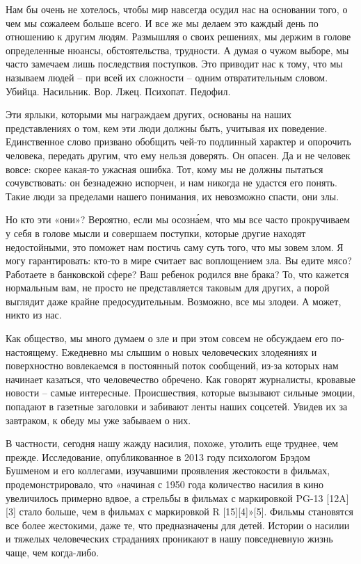 Нам бы очень не хотелось, чтобы мир навсегда осудил нас на основании того, о
чем мы сожалеем больше всего. И все же мы делаем это каждый день по отношению к
другим людям. Размышляя о своих решениях, мы держим в голове определенные
нюансы, обстоятельства, трудности. А думая о чужом выборе, мы часто замечаем
лишь последствия поступков. Это приводит нас к тому, что мы называем людей –
при всей их сложности – одним отвратительным словом. Убийца. Насильник. Вор.
Лжец. Психопат. Педофил.
	
	

Эти ярлыки, которыми мы награждаем других, основаны на наших представлениях о том, кем эти люди должны быть, учитывая их поведение. Единственное слово призвано обобщить чей-то подлинный характер и опорочить человека, передать другим, что ему нельзя доверять. Он опасен. Да и не человек вовсе: скорее какая-то ужасная ошибка. Тот, кому мы не должны пытаться сочувствовать: он безнадежно испорчен, и нам никогда не удастся его понять. Такие люди за пределами нашего понимания, их невозможно спасти, они злы.

Но кто эти «они»? Вероятно, если мы осозна́ем, что мы все часто прокручиваем у себя в голове мысли и совершаем поступки, которые другие находят недостойными, это поможет нам постичь саму суть того, что мы зовем злом. Я могу гарантировать: кто-то в мире считает вас воплощением зла. Вы едите мясо? Работаете в банковской сфере? Ваш ребенок родился вне брака? То, что кажется нормальным вам, не просто не представляется таковым для других, а порой выглядит даже крайне предосудительным. Возможно, все мы злодеи. А может, никто из нас.

Как общество, мы много думаем о зле и при этом совсем не обсуждаем его по-настоящему. Ежедневно мы слышим о новых человеческих злодеяниях и поверхностно вовлекаемся в постоянный поток сообщений, из-за которых нам начинает казаться, что человечество обречено. Как говорят журналисты, кровавые новости – самые интересные. Происшествия, которые вызывают сильные эмоции, попадают в газетные заголовки и забивают ленты наших соцсетей. Увидев их за завтраком, к обеду мы уже забываем о них.

В частности, сегодня нашу жажду насилия, похоже, утолить еще труднее, чем прежде. Исследование, опубликованное в 2013 году психологом Брэдом Бушменом и его коллегами, изучавшими проявления жестокости в фильмах, продемонстрировало, что «начиная с 1950 года количество насилия в кино увеличилось примерно вдвое, а стрельбы в фильмах с маркировкой PG-13 [12A][3] стало больше, чем в фильмах с маркировкой R [15][4]»[5]. Фильмы становятся все более жестокими, даже те, что предназначены для детей. Истории о насилии и тяжелых человеческих страданиях проникают в нашу повседневную жизнь чаще, чем когда-либо.

